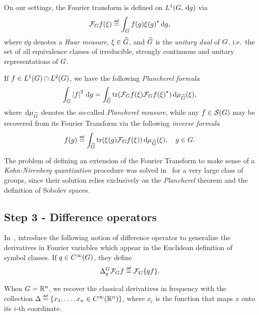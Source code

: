 On our settings,
the Fourier transform is defined on ${L^{1} (G, \,\mathrm{d} g)}$ via
\begin{align*}
    \Fourier f(\xi)
    \defeq \int_\Group f(g) \adj{\xi(g)} \dd g,
\end{align*}
where $\dd g$ denotes a \emph{Haar measure},
$\xi \in {\widehat{G}}$,
and ${\widehat{G}}$ is the \emph{unitary dual} of $G$,
i.e.\ the set of all equivalence classes of irreducible, strongly continuous and unitary representations of $G$.

If $f \in {L^{1} (G)} \cap {L^{2} (G)}$,
we have the following \emph{Plancherel formula}
\begin{align*}
    \int_G \left|{f}\right|^2 \,\mathrm{d} g
    = \int_{{\widehat{G}}}
    \operatorname{tr}(\mathcal{F}_{G} f(\xi) {\mathcal{F}_{G} f(\xi)}^\star)
    \,\mathrm{d} \mu_{{\widehat{G}}}(\xi),
\end{align*}
where $\,\mathrm{d} \mu_{{\widehat{G}}}$ denotes the so-called \emph{Plancherel measure},
while any $f \in {\mathcal{S} (G)}$ may be recovered from its Fourier Transform via
the following \emph{inverse formula}
\begin{align*}
    f(g) \defeq
    \int_{\dualGroup \Group}
    \tr(\xi(g) \Fourier f(\xi))
    \dd \mu_{\dualGroup \Group}(\xi),
    \quad g \in \Group.
\end{align*}

The problem of defining an extension of the Fourier Transform to make sense of a \emph{Kohn-Nirenberg quantization} procedure was solved in~\cite[Subsection 5.1.1]{FischerRuzhansky16} for a very large class of groups,
since their solution relies exclusively on the \emph{Plancherel} theorem and the definition of Sobolev spaces.

\subsection*{Step 3 - Difference operators}

In~\cite{RuzhanskyTurunen10},
\citeauthor{RuzhanskyTurunen10} introduce the following notion of difference operator
to generalize the derivatives in Fourier variables which appear in the Euclidean definition of symbol classes.
If $q \in {C^\infty(G)}$,
they define
\begin{align*}
    \DifferenceOperator [\Group] q \Fourier f \defeq \Fourier \{q f\}.
\end{align*}

When $G = \mathbb{R}^n$,
we recover the classical derivatives in frequency with the collection
$\Delta \defeq \{x_1, \dots, x_n \in \SmoothFunctions {\R^n}\}$,
where $x_i$ is the function that maps $x$ onto its $i$-th coordinate.

